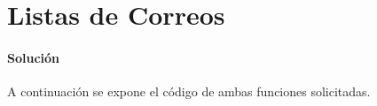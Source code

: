 \section{Listas de Correos}

  \paragraph{Solución}
  A continuación se expone el código
  de ambas funciones solicitadas.
  
  
